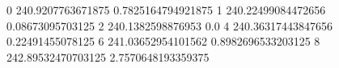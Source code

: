 0 240.9207763671875 0.7825164794921875
1 240.22499084472656 0.08673095703125
2 240.1382598876953 0.0
4 240.36317443847656 0.22491455078125
6 241.03652954101562 0.8982696533203125
8 242.89532470703125 2.7570648193359375

